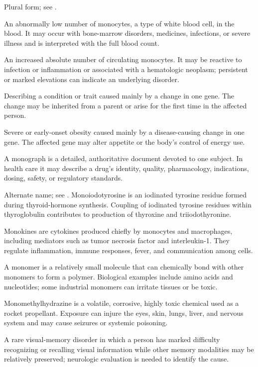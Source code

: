  Plural form; see .

 An abnormally low number of monocytes, a type of white blood cell, in the blood. It may occur with bone-marrow disorders, medicines, infections, or severe illness and is interpreted with the full blood count.

 An increased absolute number of circulating monocytes. It may be reactive to infection or inflammation or associated with a hematologic neoplasm; persistent or marked elevations can indicate an underlying disorder.

 Describing a condition or trait caused mainly by a change in one gene. The change may be inherited from a parent or arise for the first time in the affected person.

 Severe or early-onset obesity caused mainly by a disease-causing change in one gene. The affected gene may alter appetite or the body's control of energy use.

 A monograph is a detailed, authoritative document devoted to one subject. In health care it may describe a drug’s identity, quality, pharmacology, indications, dosing, safety, or regulatory standards.

 Alternate name; see .
 Monoiodotyrosine is an iodinated tyrosine residue formed during thyroid-hormone synthesis. Coupling of iodinated tyrosine residues within thyroglobulin contributes to production of thyroxine and triiodothyronine.

 Monokines are cytokines produced chiefly by monocytes and macrophages, including mediators such as tumor necrosis factor and interleukin-1. They regulate inflammation, immune responses, fever, and communication among cells.

 A monomer is a relatively small molecule that can chemically bond with other monomers to form a polymer. Biological examples include amino acids and nucleotides; some industrial monomers can irritate tissues or be toxic.

 Monomethylhydrazine is a volatile, corrosive, highly toxic chemical used as a rocket propellant. Exposure can injure the eyes, skin, lungs, liver, and nervous system and may cause seizures or systemic poisoning.

 A rare visual-memory disorder in which a person has marked difficulty recognizing or recalling visual information while other memory modalities may be relatively preserved; neurologic evaluation is needed to identify the cause.

